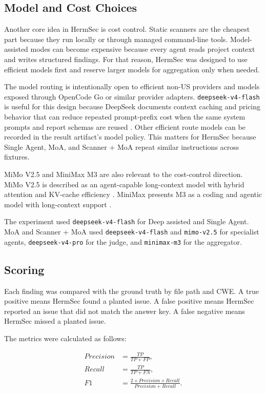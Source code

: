 \documentclass[sigconf,nonacm]{acmart}
\begin{document}
\subsection{Model and Cost Choices}
Another core idea in HermSec is cost control. Static scanners are the cheapest part because they run locally or through managed command-line tools. Model-assisted modes can become expensive because every agent reads project context and writes structured findings. For that reason, HermSec was designed to use efficient models first and reserve larger models for aggregation only when needed.

The model routing is intentionally open to efficient non-US providers and models exposed through OpenCode Go or similar provider adapters. \texttt{deepseek-v4-flash} is useful for this design because DeepSeek documents context caching and pricing behavior that can reduce repeated prompt-prefix cost when the same system prompts and report schemas are reused \cite{deepseekcache,deepseekpricing}. Other efficient route models can be recorded in the result artifact's model policy. This matters for HermSec because Single Agent, MoA, and Scanner + MoA repeat similar instructions across fixtures.

MiMo V2.5 and MiniMax M3 are also relevant to the cost-control direction. MiMo V2.5 is described as an agent-capable long-context model with hybrid attention and KV-cache efficiency \cite{xiaomimimo25,xiaomimimo25inference}. MiniMax presents M3 as a coding and agentic model with long-context support \cite{minimaxm3}.

The experiment used \texttt{deepseek-v4-flash} for Deep assisted and Single Agent. MoA and Scanner + MoA used \texttt{deepseek-v4-flash} and \texttt{mimo-v2.5} for specialist agents, \texttt{deepseek-v4-pro} for the judge, and \texttt{minimax-m3} for the aggregator.

\subsection{Scoring}
Each finding was compared with the ground truth by file path and CWE. A true positive means HermSec found a planted issue. A false positive means HermSec reported an issue that did not match the answer key. A false negative means HermSec missed a planted issue.

The metrics were calculated as follows:

\[
\begin{aligned}
Precision &= \frac{TP}{TP + FP},\\
Recall &= \frac{TP}{TP + FN},\\
F1 &= \frac{2 \times Precision \times Recall}{Precision + Recall}.
\end{aligned}
\]
\end{document}
